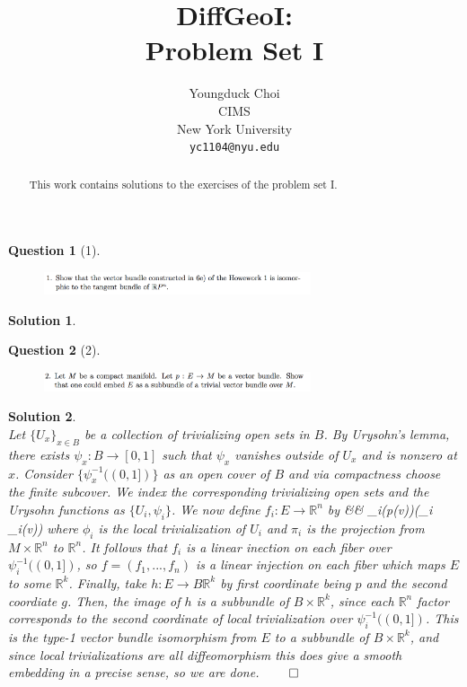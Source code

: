 \documentclass{article} %
\title{DiffGeoI: \\
Problem Set I}
\author{
Youngduck Choi \\
CIMS \\
New York University\\
\texttt{yc1104@nyu.edu} \\
}
\def\eQb#1\eQe{\begin{eqnarray*}#1\end{eqnarray*}}
\theoremstyle{quest}
\newtheorem*{question}{Question}
\newtheorem*{solution}{Solution}
\begin{document}
\maketitle

\begin{abstract}
This work contains solutions to the exercises of the problem set I.
\end{abstract}

\bigskip

\begin{question}[1]
\hfill
\begin{figure}[h!]
  \centering
    \includegraphics[width=0.7\textwidth]{DG-e3-p1.png}
\end{figure}
\end{question}
\begin{solution} \hfill \\

\end{solution}

\newpage

\begin{question}[2]
\hfill
\begin{figure}[h!]
  \centering
    \includegraphics[width=0.7\textwidth]{DG-e3-p2.png}
\end{figure}
\end{question}
\begin{solution} \hfill \\
Let $\{U_x\}_{x \in B}$ be a collection of trivializing open sets in $B$. By 
Urysohn's lemma, there exists $\psi_x:B \to [0,1]$ such that $\psi_x$ vanishes
outside of $U_x$ and is nonzero at $x$. Consider $\{\psi_x^{-1}((0,1])\}$ 
as an open cover of $B$ and via compactness choose the finite subcover. We index
the corresponding trivializing open sets and the Urysohn functions as $\{ 
U_i, \psi_i\}$. We now define $f_i:E \to \mathbb{R}^n$ by 
\eQb
v &\mapsto& \psi_i(p(v))(\pi_i \phi_i(v))
\eQe 
where $\phi_i$ is the local trivialization of $U_i$ and $\pi_i$ is the 
projection from $M \times \mathbb{R}^n$ to $\mathbb{R}^n$. It follows that
$f_i$ is a linear inection on each fiber over $\psi_i^{-1}((0,1])$, so 
$f = (f_1,...,f_n)$ is a linear injection on each fiber which maps $E$ to 
some $\mathbb{R}^{k}$. Finally, take $h:E \to B \mathbb{R}^k$ by
first coordinate being $p$ and the second coordiate $g$. Then, the image of 
$h$ is a subbundle of $B \times \mathbb{R}^k$, since each $\mathbb{R}^n$ factor 
corresponds to the second coordinate of 
local trivialization over $\psi_i^{-1}((0,1])$.
This is the type-1 vector bundle isomorphism from $E$ to a subbundle of $B 
\times \mathbb{R}^k$, and since local trivializations are all diffeomorphism
this does give a smooth embedding in a precise sense,  so we are done. \hfill $\qed$


\end{solution}
\end{document}
